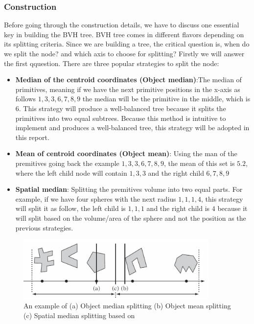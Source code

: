 \documentclass[11pt,a4paper]{article}
\begin{document}
\subsubsection{Construction}
Before going through the construction details, we have to discuss one essential key in building the BVH tree.  BVH tree comes in different flavors depending on its splitting criteria. Since we are building a tree, the critical question is, when do we split the node? and which axis to choose for splitting? Firstly we will answer the first qquestion. There are three popular strategies to split the node:


\begin{itemize}
\item \textbf{Median of the centroid coordinates (Object median)}:The median of primitives, meaning if we have the next primitive positions in the x-axis as follows ${1, 3, 3, 6, 7, 8, 9}$ the median will be the primitive in the middle, which is $6$. This strategy will produce a well-balanced tree because it splits the primitives into two equal subtrees. Because this method is intuitive to implement and produces a well-balanced tree, this strategy will be adopted in this report. 


\item  \textbf{Mean of centroid coordinates (Object mean)}: Using the man of the premitives going back the example ${1, 3, 3, 6, 7, 8, 9}$, the mean of this set is $5.2$, where the left child node will contain ${1,3,3}$ and the right child ${6,7,8,9}$

\item  \textbf{Spatial median}: Splitting the premitives volume into two equal parts. For example, if we have four spheres with the next radius ${1,1,1,4}$, this strategy will split it as follow, the left child is ${1,1,1}$ and the right child is ${4}$ because it will split based on the volume/area of the sphere and not the position as the previous strategies. 

\end{itemize}


\begin{figure}[H]	
     \centering
     \captionsetup{justification=centering,margin=2cm}
     \includegraphics[width=10cm]{images/bvh_split.png}
     \caption{An example of (a) Object median splitting (b) Object mean splitting (c) Spatial median
splitting based on \protect\cite{Ericson2004}}
        \label{fig:dice}
\end{figure}
\end{document}
